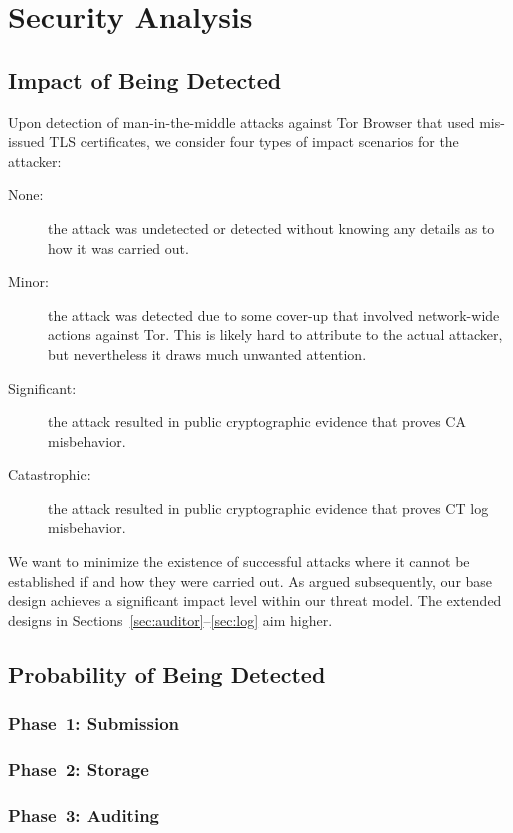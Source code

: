 \section{Security Analysis} \label{sec:analysis}

\subsection{Impact of Being Detected} \label{sec:analysis:impact}
Upon detection of man-in-the-middle attacks against Tor Browser that used 
mis-issued TLS certificates, we consider four types of impact scenarios for the
attacker:
\begin{description}
	\item[None:] the attack was undetected or detected without knowing any
		details as to how it was carried out.
	\item[Minor:] the attack was detected due to some cover-up that involved
		network-wide actions against Tor.  This is likely hard to attribute to
		the actual attacker, but nevertheless it draws much unwanted attention.
	\item[Significant:] the attack resulted in public cryptographic evidence
		that proves CA misbehavior.
	\item[Catastrophic:] the attack resulted in public cryptographic evidence
		that proves CT log misbehavior.
\end{description}

We want to minimize the existence of successful attacks where it cannot be
established if and how they were carried out.  As argued subsequently, our
base design achieves a significant impact level within our threat model.  The
extended designs in Sections~\ref{sec:auditor}--\ref{sec:log} aim higher.

\subsection{Probability of Being Detected} \label{sec:analysis:pr}
\subsubsection{Phase~1: Submission} \label{sec:analysis:pr:phase1}
\subsubsection{Phase~2: Storage} \label{sec:analysis:pr:phase2}
\subsubsection{Phase~3: Auditing} \label{sec:analysis:pr:phase3}


